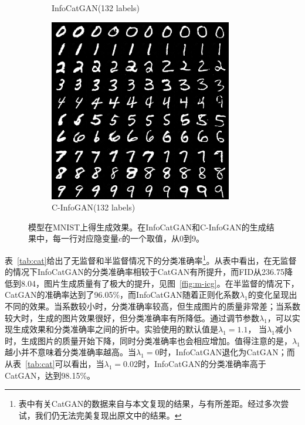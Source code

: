 \begin{figure}[htbp]
\begin{subfigure}[b]{\trif\textwidth}
    \caption{InfoCatGAN(132 labels)}
    \label{ffig:m-ss-icg}
  \end{subfigure}
  \begin{subfigure}[b]{\trif\textwidth}
    \includegraphics[width=\textwidth]{Img/ig-132labels.png}
    \caption{C-InfoGAN(132 labels)}
    \label{ffig:m-ss-ig}
  \end{subfigure}

  \caption{模型在MNIST上得生成效果。在InfoCatGAN和C-InfoGAN的生成结果中，每一行对应隐变量$c$的一个取值，从0到9。}
  \label{fig:mnist}
\end{figure}

表~\ref{tab:cat}给出了无监督和半监督情况下的分类准确率\footnote{表中有关CatGAN的数据来自与本文复现的结果，与\citet{springenberg2015unsupervised}有所差距。经过多次尝试，我们仍无法完美复现出原文中的结果。}。从表中看出，在无监督的情况下InfoCatGAN的分类准确率相较于CatGAN有所提升，而FID从236.75降低到8.04，图片生成质量有了极大的提升，见图~\ref{ffig:m-icg}。在半监督的情况下，CatGAN的准确率达到了96.05\%，而InfoCatGAN随着正则化系数$\lambda_1$的变化呈现出不同的效果。当系数较小时，分类准确率较高，但生成图片的质量非常差；当系数较大时，生成的图片效果很好，但分类准确率有所降低。通过调节参数$\lambda_1$，可以实现生成效果和分类准确率之间的折中。实验使用的默认值是$\lambda_1 = 1.1$，
当$\lambda_1$减小时，生成图片的质量开始下降，同时分类准确率也会相应增加。值得注意的是，$\lambda_1$越小并不意味着分类准确率越高。当$\lambda_1=0$时，InfoCatGAN退化为CatGAN；而从表~\ref{tab:cat}可以看出，当$\lambda_1=0.02$时，InfoCatGAN的分类准确率高于CatGAN，达到98.15\%。

